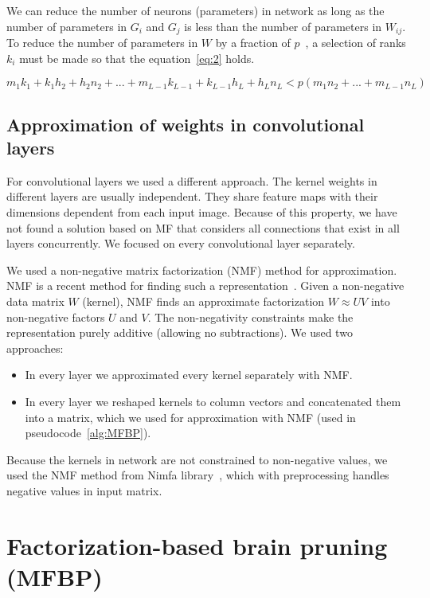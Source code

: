 \documentclass{article} %
\begin{document}
We can reduce the number of neurons (parameters) in network as long as the number 
of parameters in $G_i$ and $G_j$ is less than the number of parameters in 
$W_{ij}$. To reduce the number of parameters in $W$ by a fraction of 
$p$~\cite{sainath2013low}, a selection of ranks $k_i$ must be made so that the 
equation~\ref{eq:2} holds.

\begin{equation} \label{eq:2}
 m_1k_1 + k_1h_2 + h_2n_2 + ... + m_{L-1}k_{L-1} + k_{L-1}h_L + h_Ln_L < 
p(m_1n_2 + ... + m_{L-1}n_L)
\end{equation}


\subsection{Approximation of weights in convolutional layers}

For convolutional layers we used a different approach. The kernel weights in different 
layers are usually independent. They share feature maps with their dimensions dependent 
from each input image. Because of this property, we have not found a solution based on MF 
that considers all connections that exist in all layers concurrently. We focused on every 
convolutional layer separately.

We used a non-negative matrix factorization (NMF) method for approximation. NMF is a 
recent method for finding such a representation~\cite{hoyer2004non}. Given a non-negative 
data matrix $W$ (kernel), NMF finds an approximate factorization $W \approx UV$ into 
non-negative factors $U$ and $V$. The non-negativity constraints make the representation 
purely additive (allowing no subtractions). 
We used two approaches:
\begin{itemize}
\item In every layer we approximated every kernel separately with NMF. 
\item In every layer we reshaped kernels to column vectors and concatenated them into a 
matrix, which we used for approximation with NMF (used in pseudocode~\ref{alg:MFBP}).
\end{itemize} Because the kernels in network are not constrained to non-negative 
values, we used the NMF method from Nimfa library~\citep{Zitnik2012}, which with 
preprocessing handles negative values in input matrix.


\section{Factorization-based brain pruning (MFBP)}
\end{document}
